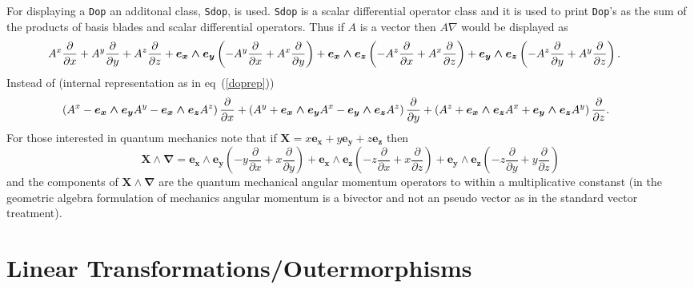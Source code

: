 \documentclass[12pt,twoside,openright]{memoir}
\newcommand{\bm}[1]{\boldsymbol{#1}}
\newcommand{\bfrac}[2]{\displaystyle\frac{#1}{#2}}
\newcommand{\lp}{\left (}
\newcommand{\rp}{\right )}
\newcommand{\pdiff}[2]{\bfrac{\partial {#1}}{\partial {#2}}}
\newcommand{\W}{\wedge}
\newcommand{\paren}[1]{\lp {#1} \rp}
\newcommand{\T}[1]{\texttt{#1}}
\begin{document}
For displaying a \T{Dop} an additonal class, \T{Sdop}, is used.  \T{Sdop} is a scalar differential operator class and it is used to print
\T{Dop}'s as the sum of the products of basis blades and scalar differential operators.  Thus if $A$ is a vector then $A\nabla$ would be
displayed as
\begin{equation*}
\hspace{-0.4in} A^{x} \bfrac{\partial}{\partial x} + A^{y} \bfrac{\partial}{\partial y} + A^{z} \bfrac{\partial}{\partial z} + \bm{e_{x}\wedge e_{y}} \left ( - A^{y} \bfrac{\partial}{\partial x} + A^{x} \bfrac{\partial}{\partial y}\right )  + \bm{e_{x}\wedge e_{z}} \left ( - A^{z} \bfrac{\partial}{\partial x} + A^{x} \bfrac{\partial}{\partial z}\right )  + \bm{e_{y}\wedge e_{z}} \left ( - A^{z} \bfrac{\partial}{\partial y} + A^{y} \bfrac{\partial}{\partial z}\right ). 
\end{equation*} 
Instead of (internal representation as in eq~(\ref{doprep}))
\begin{equation*}
\hspace{-.35in}\paren{A^{x}-\bm{e_{x}\W e_{y}}A^{y}-\bm{e_{x}\W e_{z}}A^{z}}\pdiff{}{x} +
\paren{A^{y}+\bm{e_{x}\W e_{y}}A^{x}-\bm{e_{y}\W e_{z}}A^{z}}\pdiff{}{y} +
\paren{A^{z}+\bm{e_{x}\W e_{z}}A^{x}+\bm{e_{y}\W e_{z}}A^{y}}\pdiff{}{z}. 
\end{equation*}
For those interested in quantum mechanics note that if $\bm{X} = x\bm{e_{x}}+y\bm{e_{y}}+z\bm{e_{z}}$ then
\begin{equation*} \bm{X}\W\bm{\nabla} = \bm{e_{x}\wedge e_{y}} \left ( - y \bfrac{\partial}{\partial x} + x \bfrac{\partial}{\partial y}\right )  + \bm{e_{x}\wedge e_{z}} \left ( - z \bfrac{\partial}{\partial x} + x \bfrac{\partial}{\partial z}\right )  + \bm{e_{y}\wedge e_{z}} \left ( - z \bfrac{\partial}{\partial y} + y \bfrac{\partial}{\partial z}\right )
\end{equation*}
and the components of $\bm{X}\W\bm{\nabla}$ are the quantum mechanical angular momentum operators to within a multiplicative constanst
(in the geometric algebra formulation of mechanics angular momentum is a bivector and not an pseudo vector as in the standard vector
treatment).
\section{Linear Transformations/Outermorphisms}\label{Ltrans}
\end{document}

